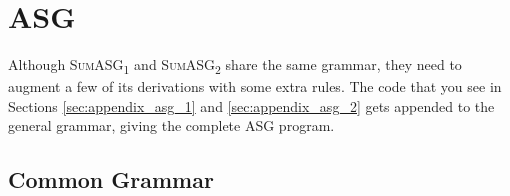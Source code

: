 \label{appendix:asg}

\chapter{ASG}

Although \textsc{SumASG\textsubscript{1}} and \textsc{SumASG\textsubscript{2}} share the same grammar, they need to augment a few of its derivations with some extra rules. The code that you see in Sections \ref{sec:appendix_asg_1} and \ref{sec:appendix_asg_2} gets appended to the general grammar, giving the complete ASG program.

\section{Common Grammar}

